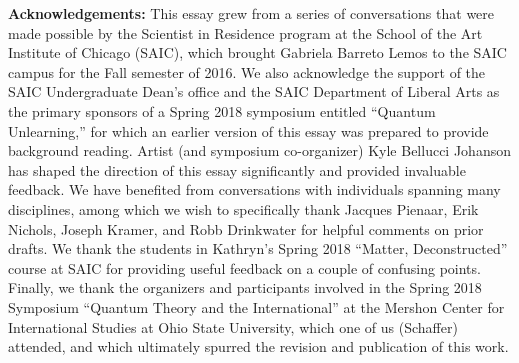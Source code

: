 \documentclass[12pt,onecolumn,preprintnumbers,amsmath,amssymbn,reprint,nofootinbib,superscriptaddress]{revtex4}    %
\begin{document}
\textbf{Acknowledgements:} This essay grew from a series of conversations that were made possible by the Scientist in Residence program at the School of the Art Institute of Chicago (SAIC), which brought Gabriela Barreto Lemos to the SAIC campus for the Fall semester of 2016.  We also acknowledge the support of the SAIC Undergraduate Dean's office and the SAIC Department of Liberal Arts as the primary sponsors of a Spring 2018 symposium entitled ``Quantum Unlearning,'' for which an earlier version of this essay was prepared to provide background reading.  Artist (and symposium co-organizer) Kyle Bellucci Johanson has shaped the direction of this essay significantly and provided invaluable feedback.  We have benefited from conversations with individuals spanning many disciplines, among which we wish to specifically thank Jacques Pienaar, Erik Nichols, Joseph Kramer, and Robb Drinkwater for helpful comments on prior drafts.  We thank the students in Kathryn's Spring 2018 ``Matter, Deconstructed'' course at SAIC for providing useful feedback on a couple of confusing points.  Finally, we thank the organizers and participants involved in the Spring 2018 Symposium ``Quantum Theory and the International'' at the Mershon Center for International Studies at Ohio State University, which one of us (Schaffer) attended, and which ultimately spurred the revision and publication of this work. 

\end{document}
